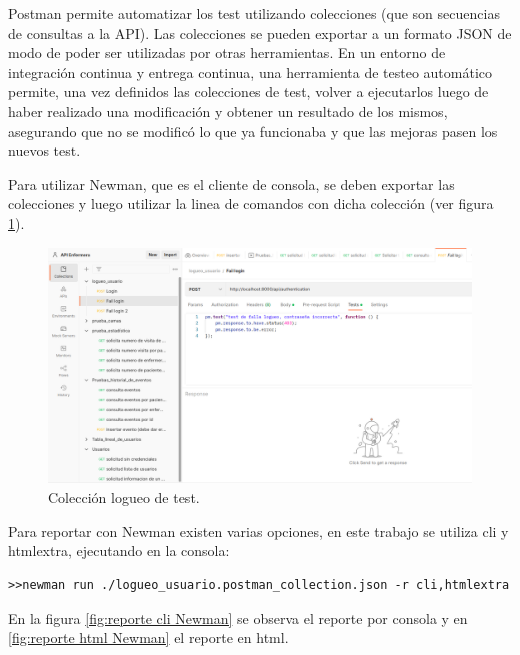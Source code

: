 Postman permite automatizar los test utilizando colecciones (que son secuencias de consultas a la API). Las colecciones se pueden exportar a un formato JSON de modo de poder ser utilizadas por otras herramientas. En un entorno de integración continua y entrega continua, una herramienta de testeo automático permite, una vez definidos las colecciones de test, volver a ejecutarlos luego de haber realizado una modificación y obtener un resultado de los mismos, asegurando que no se modificó lo que ya funcionaba y que las mejoras pasen los nuevos test. 

Para utilizar Newman, que es el cliente de consola, se deben exportar las colecciones y luego utilizar la linea de comandos con dicha colección (ver figura \ref{fig:Colección logueo usuario en Postman}). 


\begin{figure}[ht]
	\centering
	\includegraphics[scale=.25]{./Figures/Postman.png}
	\caption{Colección logueo de test.}
	\label{fig:Colección logueo usuario en Postman}
\end{figure}

Para reportar con Newman existen varias opciones, en este trabajo se utiliza cli y htmlextra, ejecutando en la consola:



\begin{lstlisting}[label=cod:Newman,caption=  Ejecución de Newman en consola]
>>newman run ./logueo_usuario.postman_collection.json -r cli,htmlextra
\end{lstlisting}



En la figura \ref{fig:reporte cli Newman} se observa el reporte por consola y en \ref{fig:reporte html Newman} el reporte en html.

